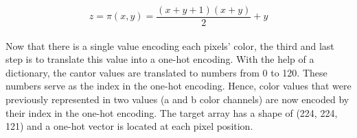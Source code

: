 \documentclass[12pt,letterpaper]{article}
\begin{document}
\begin{equation}
z = \pi(x,y) = \frac{(x+y+1)(x+y)}{2}+y
\end{equation}
\\
Now that there is a single value encoding each pixels’ color, the third and last step is to translate this value into a one-hot encoding. With the help of a dictionary, the cantor values are translated to numbers from 0 to 120. These numbers serve as the index in the one-hot encoding. Hence, color values that were previously represented in two values (a and b color channels) are now encoded by their index in the one-hot encoding. The target array has a shape of (224, 224, 121) and a one-hot vector is located at each pixel position.

\end{document}
